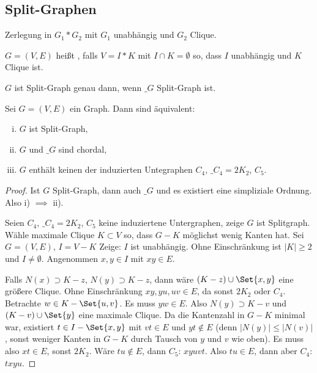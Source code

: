 \subsection{Split-Graphen}

Zerlegung in $G_1 \ast G_2$ mit $G_1$ unabhängig und $G_2$ Clique.

\begin{df}
    $G = (V, E)$ heißt , falls $V = I \ast K$ mit $I \cap K = \emptyset$ so, dass $I$ unabhängig und $K$ Clique ist.
\end{df}

\begin{lem}
    $G$ ist Split-Graph genau dann, wenn $\_G$ Split-Graph ist.
\end{lem}

\begin{st}
    Sei $G = (V, E)$ ein Graph.
    Dann sind äquivalent:
    \begin{enumerate}[i)]
        \item
            $G$ ist Split-Graph,
        \item
            $G$ und $\_G$ sind chordal,
        \item
            $G$ enthält keinen der induzierten Untegraphen $C_4$, $\_{C_4} = 2 K_2$, $C_5$.
    \end{enumerate}
    \begin{proof}
        Ist $G$ Split-Graph, dann auch $\_G$ und es existiert eine simpliziale Ordnung.
        Also i) $\implies$ ii).

        Seien $C_4$, $\_{C_4} = 2 K_2$, $C_5$ keine induziertene Untergraphen, zeige $G$ ist Splitgraph.
        Wähle maximale Clique $K \subset V$ so, dass $G - K$ möglichst wenig Kanten hat.
        Sei $G = (V, E)$, $I = V - K$
        Zeige: $I$ ist unabhängig.
        Ohne Einschränkung ist $|K| \ge 2$ und $I \neq \emptyset$.
        Angenommen $x,y \in I$ mit $xy \in E$.

        Falls $N(x) \supset K - z$, $N(y) \supset K - z$, dann wäre $(K-z) \cup \Set{x,y}$ eine größere Clique.
        Ohne Einschränkung $xy, yu, uv \in E$, da sonst $2K_2$ oder $C_4$.
        Betrachte $w \in K - \Set{u,v}$.
        Es muss $yw \in E$.
        Also $N(y) \supset K - v$ und $(K-v) \cup \Set{y}$ eine maximale Clique.
        Da die Kantenzahl in $G - K$ minimal war, existiert $t \in I - \Set{x,y}$ mit $vt \in E$ und $yt \not\in E$ (denn $|N(y)| \le |N(v)|$, sonst weniger Kanten in $G - K$ durch Tausch von $y$ und $v$ wie oben).
        Es muss also $xt \in E$, sonst $2 K_2$.
        Wäre $tu \not\in E$, dann $C_5$: $xyuvt$.
        Also $tu \in E$, dann aber $C_4$: $txyu$.
    \end{proof}
\end{st}


